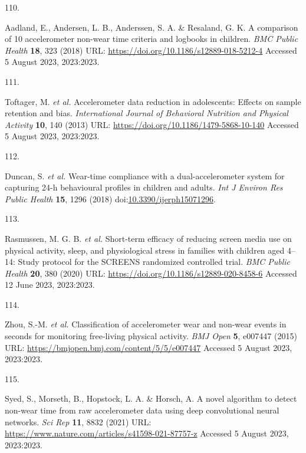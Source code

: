\documentclass[
  10pt,
]{scrbook}
\newlength{\cslhangindent}
\newlength{\csllabelwidth}
\newlength{\cslentryspacingunit} %
\newenvironment{CSLReferences}[2] %
 {%
  \setlength{\parindent}{0pt}
  \ifodd #1
  \let\oldpar\par
  \def\par{\hangindent=\cslhangindent\oldpar}
  \fi
  \setlength{\parskip}{#2\cslentryspacingunit}
 }%
 {}
\newcommand{\CSLLeftMargin}[1]{\parbox[t]{\csllabelwidth}{#1}}
\newcommand{\CSLRightInline}[1]{\parbox[t]{\linewidth - \csllabelwidth}{#1}\break}
\let\originaltextbf\textbf
\renewcommand{\textbf}[1]{\textcolor{color1}{\originaltextbf{#1}}}
\begin{document}
\begin{CSLReferences}{0}{0}
\leavevmode{}%
\CSLLeftMargin{110. }%
\CSLRightInline{Aadland, E., Andersen, L. B., Anderssen, S. A. \&
Resaland, G. K. A comparison of 10 accelerometer non-wear time criteria
and logbooks in children. \emph{{BMC} Public Health} \textbf{18}, 323
(2018) URL: \url{https://doi.org/10.1186/s12889-018-5212-4} Accessed 5
August 2023, 2023:2023.}

\leavevmode{}%
\CSLLeftMargin{111. }%
\CSLRightInline{Toftager, M. \emph{et al.} Accelerometer data reduction
in adolescents: Effects on sample retention and bias.
\emph{International Journal of Behavioral Nutrition and Physical
Activity} \textbf{10}, 140 (2013) URL:
\url{https://doi.org/10.1186/1479-5868-10-140} Accessed 5 August 2023,
2023:2023.}

\leavevmode{}%
\CSLLeftMargin{112. }%
\CSLRightInline{Duncan, S. \emph{et al.} Wear-time compliance with a
dual-accelerometer system for capturing 24-h behavioural profiles in
children and adults. \emph{Int J Environ Res Public Health} \textbf{15},
1296 (2018)
doi:\href{https://doi.org/10.3390/ijerph15071296}{10.3390/ijerph15071296}.}

\leavevmode{}%
\CSLLeftMargin{113. }%
\CSLRightInline{Rasmussen, M. G. B. \emph{et al.} Short-term efficacy of
reducing screen media use on physical activity, sleep, and physiological
stress in families with children aged 4--14: Study protocol for the
{SCREENS} randomized controlled trial. \emph{{BMC} Public Health}
\textbf{20}, 380 (2020) URL:
\url{https://doi.org/10.1186/s12889-020-8458-6} Accessed 12 June 2023,
2023:2023.}

\leavevmode{}%
\CSLLeftMargin{114. }%
\CSLRightInline{Zhou, S.-M. \emph{et al.} Classification of
accelerometer wear and non-wear events in seconds for monitoring
free-living physical activity. \emph{{BMJ} Open} \textbf{5}, e007447
(2015) URL: \url{https://bmjopen.bmj.com/content/5/5/e007447} Accessed 5
August 2023, 2023:2023.}

\leavevmode{}%
\CSLLeftMargin{115. }%
\CSLRightInline{Syed, S., Morseth, B., Hopstock, L. A. \& Horsch, A. A
novel algorithm to detect non-wear time from raw accelerometer data
using deep convolutional neural networks. \emph{Sci Rep} \textbf{11},
8832 (2021) URL:
\url{https://www.nature.com/articles/s41598-021-87757-z} Accessed 5
August 2023, 2023:2023.}


\end{CSLReferences}
\end{document}
